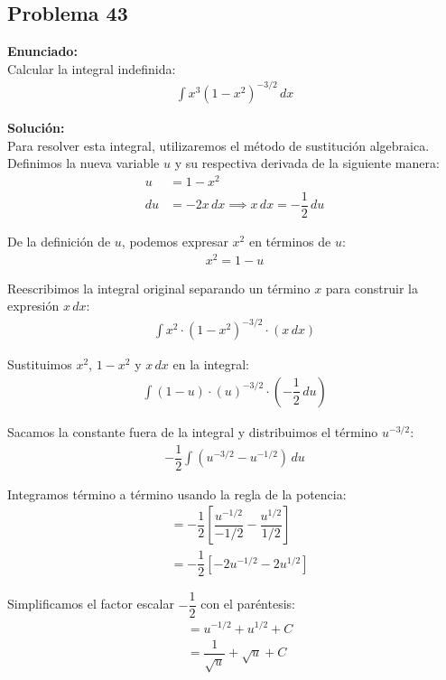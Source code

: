 \subsection*{Problema 43}

\textbf{Enunciado:} \\
Calcular la integral indefinida:
\begin{align*}
\int x^3 (1 - x^2)^{-3/2} \, dx
\end{align*}

\textbf{Solución:} \\
Para resolver esta integral, utilizaremos el método de sustitución algebraica. 
Definimos la nueva variable $u$ y su respectiva derivada de la siguiente manera:
\begin{align*}
u &= 1 - x^2 \\
du &= -2x \, dx \implies x \, dx = -\dfrac{1}{2} \, du
\end{align*}

De la definición de $u$, podemos expresar $x^2$ en términos de $u$:
\begin{align*}
x^2 = 1 - u
\end{align*}

Reescribimos la integral original separando un término $x$ para construir la expresión $x \, dx$:
\begin{align*}
\int x^2 \cdot (1 - x^2)^{-3/2} \cdot (x \, dx)
\end{align*}

Sustituimos $x^2$, $1 - x^2$ y $x \, dx$ en la integral:
\begin{align*}
\int (1 - u) \cdot (u)^{-3/2} \cdot \left(-\dfrac{1}{2} \, du\right)
\end{align*}

Sacamos la constante fuera de la integral y distribuimos el término $u^{-3/2}$:
\begin{align*}
-\dfrac{1}{2} \int (u^{-3/2} - u^{-1/2}) \, du
\end{align*}

Integramos término a término usando la regla de la potencia:
\begin{align*}
&= -\dfrac{1}{2} \left[ \dfrac{u^{-1/2}}{-1/2} - \dfrac{u^{1/2}}{1/2} \right] \\
&= -\dfrac{1}{2} \left[ -2u^{-1/2} - 2u^{1/2} \right]
\end{align*}

Simplificamos el factor escalar $-\dfrac{1}{2}$ con el paréntesis:
\begin{align*}
&= u^{-1/2} + u^{1/2} + C \\
&= \dfrac{1}{\sqrt{u}} + \sqrt{u} + C
\end{align*}


